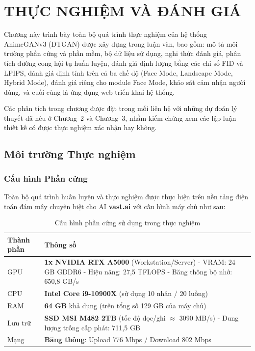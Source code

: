 \clearpage


\setcounter{chapter}{3}
\chapter[{THỰC NGHIỆM VÀ ĐÁNH GIÁ}]{THỰC NGHIỆM VÀ ĐÁNH GIÁ}

Chương này trình bày toàn bộ quá trình thực nghiệm của hệ thống AnimeGANv3 (DTGAN) được xây dựng trong luận văn, bao gồm: mô tả môi trường phần cứng và phần mềm, bộ dữ liệu sử dụng, nghi thức đánh giá, phân tích đường cong hội tụ huấn luyện, đánh giá định lượng bằng các chỉ số FID và LPIPS, đánh giá định tính trên cả ba chế độ (Face Mode, Landscape Mode, Hybrid Mode), đánh giá riêng cho module Face Mode, khảo sát cảm nhận người dùng, và cuối cùng là ứng dụng web triển khai hệ thống.

Các phân tích trong chương được đặt trong mối liên hệ với những dự đoán lý thuyết đã nêu ở Chương~2 và Chương~3, nhằm kiểm chứng xem các lập luận thiết kế có được thực nghiệm xác nhận hay không.

\section{Môi trường Thực nghiệm}
\label{sec:exp_env}

\subsection{Cấu hình Phần cứng}
\label{subsec:hardware}

Toàn bộ quá trình huấn luyện và thực nghiệm được thực hiện trên nền tảng điện toán đám mây chuyên biệt cho AI \textbf{vast.ai} với cấu hình máy chủ như sau:

\begin{table}[H]
\caption{Cấu hình phần cứng sử dụng trong thực nghiệm}
\label{tab:hardware}
\centering
\begin{tabular}{|p{3.5cm}|p{11.5cm}|}
\hline
\textbf{Thành phần} & \textbf{Thông số} \\
\hline
GPU & \textbf{1x NVIDIA RTX A5000} (Workstation/Server) \newline - VRAM: 24 GB GDDR6 \newline - Hiệu năng: 27,5 TFLOPS \newline - Băng thông bộ nhớ: 650,8 GB/s \\
\hline
CPU & \textbf{Intel Core i9-10900X} (sử dụng 10 nhân / 20 luồng) \\
\hline
RAM & \textbf{64 GB} khả dụng (trên tổng số 129 GB của máy chủ) \\
\hline
Lưu trữ & \textbf{SSD MSI M482 2TB} (tốc độ đọc/ghi $\approx$ 3090 MB/s) \newline - Dung lượng trống cấp phát: 711,5 GB \\
\hline
Mạng & \textbf{Băng thông}: Upload 776 Mbps / Download 802 Mbps \\
\hline
\end{tabular}
\end{table}

